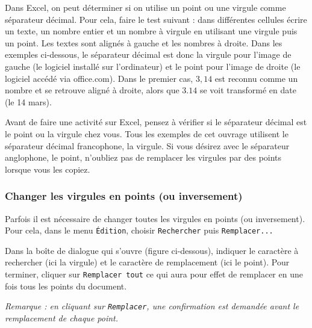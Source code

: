 \vspace{6pt}

Dans Excel, on peut déterminer si on utilise un point ou une virgule comme séparateur décimal. Pour cela, faire le test suivant : dans différentes cellules écrire un texte, un nombre entier et un nombre à virgule en utilisant une virgule puis un point. Les textes sont alignés à gauche et les nombres à droite. Dans les exemples ci-dessous, le séparateur décimal est donc la virgule pour l'image de gauche (le logiciel installé sur l'ordinateur) et le point pour l'image de droite (le logiciel accédé via office.com). Dans le premier cas, $3,14$ est reconnu comme un nombre et se retrouve aligné à droite, alors que $3.14$ se voit transformé en date (le 14 mars).


Avant de faire une activité sur Excel, pensez à vérifier si le séparateur décimal est le point ou la virgule chez vous. Tous les exemples de cet ouvrage utilisent le séparateur décimal francophone, la virgule. Si vous désirez avec le séparateur anglophone, le point, n'oubliez pas de remplacer les virgules par des points lorsque vous les copiez.

\subsubsection{Changer les virgules en points (ou inversement)}

Parfois il est nécessaire de changer toutes les virgules en points (ou inversement). Pour cela, dans le menu \texttt{Édition}, choisir \texttt{Rechercher} puis \texttt{Remplacer...}


Dans la boîte de dialogue qui s'ouvre (figure ci-dessous), indiquer le caractère à rechercher  (ici la virgule) et le caractère de remplacement  (ici le point). Pour terminer, cliquer sur \texttt{Remplacer tout}  ce qui aura pour effet de remplacer en une fois tous les points du document.

\emph{Remarque : en cliquant sur \texttt{Remplacer}, une confirmation est demandée avant le remplacement de chaque point.}




